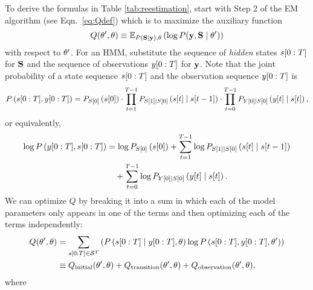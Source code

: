 To derive the formulas in Table \ref{tab:reestimation}, start with
Step 2 of the EM algorithm (see Eqn.~\eqref{eq:Qdef}) which is to
maximize the auxiliary function
\begin{equation*}
  Q(\theta',\theta) \equiv \mathbb{E}_{P \left({\bf S}\mid \mathbf{y} \right),\theta}
  \left( \log P(\mathbf{y},{\bf S}\mid \theta') \right)
\end{equation*}
with respect to $\theta'$.  For an HMM, substitute the sequence of
\emph{hidden} states $s[0:T]$ for ${\bf S}$ and the sequence of
observations $y[0:T]$ for $\mathbf{y}$.  Note that the joint probability
of a state sequence $s[0:T]$ and the observation sequence
$y[0:T]$ is
\begin{equation*}
  P\left( s[0:T],y[0:T] \right) = P_{{S}{[0]}}
  \left({s}{[0]} \right) \cdot \prod_{t=1}^{T-1} P_{{S}{[1]}\mid {S}{[0]}}
  \left({s}{[t]}\mid {s}{[t-1]} \right)
  \cdot \prod_{t=0}^{T-1}  P_{{Y}{[0]}\mid {S}{[0]}}
  \left({y}{[t]}\mid {s}{[t]} \right),
\end{equation*}
or equivalently,
\begin{align*}
  \log P\left(y[0:T], s[0:T] \right) &= \log P_{{S}{[0]}}
  \left({s}{[0]} \right) + \sum_{t=1}^{T-1} \log P_{{S}{[1]}\mid {S}{[0]}}
  \left({s}{[t]}\mid {s}{[t-1]} \right)\\
  &\quad + \sum_{t=0}^{T-1} \log  P_{{Y}{[0]}\mid {S}{[0]}}
  \left({y}{[t]}\mid {s}{[t]} \right).
\end{align*}
We can optimize $Q$ by breaking it into a sum in which each of the
model parameters only appears in one of the terms and then optimizing
each of the terms independently:
\begin{align}
  \label{eq:QHMM}
  Q(\parameters',\parameters) &= \sum_{\ts{s}{0}{T}\in\states^T}
  \left( P
  \left(\ts{s}{0}{T}\given \ts{y}{0}{T},\parameters \right) \log P
  \left(\ts{s}{0}{T},\ts{y}{0}{T},\parameters' \right) \right) \\
  \label{eq:QHMMseparate}
  & \equiv Q_{\text{initial}} (\parameters',\parameters) +
  Q_{\text{transition}} (\parameters',\parameters) + Q_{\text{observation}}
  (\parameters',\parameters),
\end{align}
where
